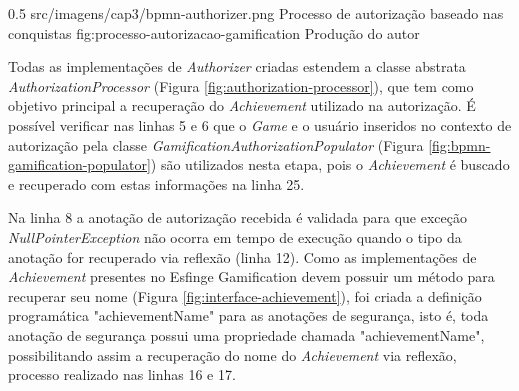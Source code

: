 \begin{image}
{0.5}
{src/imagens/cap3/bpmn-authorizer.png}
{Processo de autorização baseado nas conquistas}
{fig:processo-autorizacao-gamification}
{Produção do autor}
\end{image}


\par Todas as implementações de \textit{Authorizer} criadas estendem a classe abstrata \textit{AuthorizationProcessor} (Figura \ref{fig:authorization-processor}), que tem como objetivo principal a recuperação do \textit{Achievement} utilizado na autorização. É possível verificar nas linhas 5 e 6 que o \textit{Game} e o usuário inseridos no contexto de autorização pela classe \textit{GamificationAuthorizationPopulator} (Figura \ref{fig:bpmn-gamification-populator}) são utilizados nesta etapa, pois o \textit{Achievement} é buscado e recuperado com estas informações na linha 25.
\par Na linha 8 a anotação de autorização recebida é validada para que exceção \textit{NullPointerException} não ocorra em tempo de execução quando o tipo da anotação for recuperado via reflexão (linha 12). Como as implementações de \textit{Achievement} presentes no Esfinge Gamification devem possuir um método para recuperar seu nome (Figura \ref{fig:interface-achievement}), foi criada a definição programática "achievementName" para as anotações de segurança, isto é, toda anotação de segurança possui uma propriedade chamada "achievementName", possibilitando assim a recuperação do nome do \textit{Achievement} via reflexão, processo realizado nas linhas 16 e 17.

